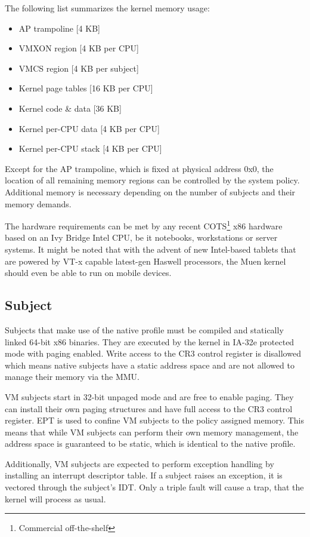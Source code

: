The following list summarizes the kernel memory usage:

\begin{itemize}
	\item AP trampoline [4 KB]
	\item VMXON region [4 KB per CPU]
	\item VMCS region [4 KB per subject]
	\item Kernel page tables [16 KB per CPU]
	\item Kernel code \& data [36 KB]
	\item Kernel per-CPU data  [4 KB per CPU]
	\item Kernel per-CPU stack [4 KB per CPU]
\end{itemize}

Except for the AP trampoline, which is fixed at physical address 0x0, the
location of all remaining memory regions can be controlled by the system policy.
Additional memory is necessary depending on the number of subjects and their
memory demands.

The hardware requirements can be met by any recent
COTS\footnote{Commercial off-the-shelf} x86 hardware based on an Ivy Bridge
Intel CPU, be it notebooks, workstations or server systems. It might be noted
that with the advent of new Intel-based tablets that are powered by VT-x capable
latest-gen Haswell processors, the Muen kernel should even be able to run on
mobile devices.

\subsection{Subject}
Subjects that make use of the native profile must be compiled and statically
linked 64-bit x86 binaries. They are executed by the kernel in IA-32e protected
mode with paging enabled. Write access to the CR3 control register is disallowed
which means native subjects have a static address space and are not allowed to
manage their memory via the MMU.

VM subjects start in 32-bit unpaged mode and are free to enable paging. They can
install their own paging structures and have full access to the CR3 control
register. EPT is used to confine VM subjects to the policy assigned memory. This
means that while VM subjects can perform their own memory management, the
address space is guaranteed to be static, which is identical to the native
profile.

Additionally, VM subjects are expected to perform exception handling by
installing an interrupt descriptor table. If a subject raises an exception, it
is vectored through the subject's IDT. Only a triple fault will cause a trap,
that the kernel will process as usual.

